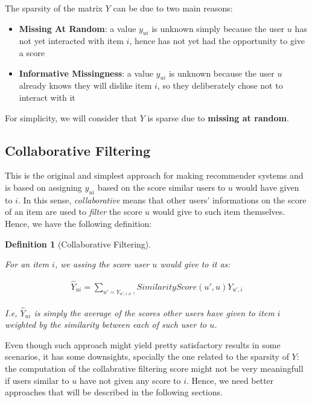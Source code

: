 \documentclass{article}
\newtheorem{definition}{Definition}[section]
\begin{document}
The sparsity of the matrix $Y$ can be due to two main reasons:

\begin{itemize}
	\item \textbf{Missing At Random}: a value $y_{ui}$ is unknown simply because the user $u$ has not yet interacted with item $i$, hence has not yet had the opportunity to give a score
	\item \textbf{Informative Missingness}: a value $y_{ui}$ is unknown because the user $u$ already knows they will dislike item $i$, so they deliberately chose not to interact with it
\end{itemize}

For simplicity, we will consider that $Y$ is sparse due to \textbf{missing at random}.



\subsection{Collaborative Filtering}

This is the original and simplest approach for making recommender systems and is based on assigning $y_{ui}$ based on the score similar users to $u$ would have given to $i$. In this sense, \textit{collaborative} means that other users' informations on the score of an item are used to \textit{filter} the score $u$ would give to such item themselves. Hence, we have the following definition:

\begin{definition}[Collaborative Filtering]
	\label{def:colab_filtering}
	
	For an item $i$, we assing the score user $u$ would give to it as:
	
	\begin{align}
		\hat{Y}_{ui} = \sum_{u'= Y_{u',i \neq?}} SimilarityScore(u', u)Y_{u',i}
	\end{align}

I.e, $\hat{Y}_{ui} $ is simply the average of the scores other users have given to item $i$ weighted by the similarity between each of such user to $u$.
\end{definition}


Even though such approach might yield pretty satisfactory results in some scenarios, it has some downsights, specially the one related to the sparsity of $Y$: the computation of the collabrative filtering score might not be very meaningfull if users similar to $u$ have not given any score to $i$. Hence, we need better approaches that will be described in the following sections.
\end{document}

